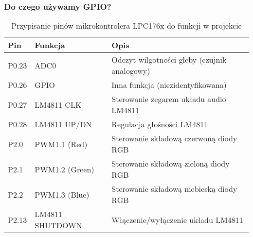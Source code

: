 \subsubsection{Do czego używamy GPIO?}

\begin{table}[H]
\centering
\caption{Przypisanie pinów mikrokontrolera LPC176x do funkcji w projekcie}
\begin{tabular}{@{}lll@{}}
\toprule
\textbf{Pin} & \textbf{Funkcja}                  & \textbf{Opis} \\ \midrule
P0.23        & ADC0                             & Odczyt wilgotności gleby (czujnik analogowy) \\
P0.26        & GPIO                             & Inna funkcja (niezidentyfikowana) \\
P0.27        & LM4811 CLK                       & Sterowanie zegarem układu audio LM4811 \\
P0.28        & LM4811 UP/DN                     & Regulacja głośności LM4811 \\
P2.0         & PWM1.1 (Red)                     & Sterowanie składową czerwoną diody RGB \\
P2.1         & PWM1.2 (Green)                   & Sterowanie składową zieloną diody RGB \\
P2.2         & PWM1.3 (Blue)                    & Sterowanie składową niebieską diody RGB \\
P2.13        & LM4811 SHUTDOWN                  & Włączenie/wyłączenie układu LM4811 \\
\bottomrule
\end{tabular}
\end{table}

